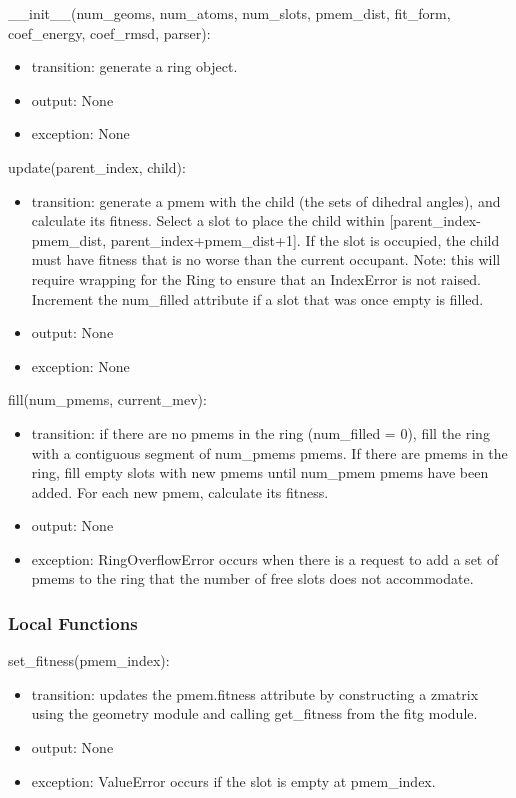\documentclass[12pt, titlepage]{article}
\begin{document}
\noindent \_\_init\_\_(num\_geoms, num\_atoms, num\_slots, pmem\_dist, 
fit\_form, coef\_energy, coef\_rmsd, parser):
\begin{itemize}
	\item transition: generate a ring object.
	\item output: None
	\item exception: None
\end{itemize}

\noindent update(parent\_index, child):
\begin{itemize}
	\item transition: generate a pmem with the child (the sets of dihedral 
	angles), and calculate its fitness. Select a slot to place the child within 
	[parent\_index-pmem\_dist, parent\_index+pmem\_dist+1]. If the slot is 
	occupied, the child must have fitness that is no worse than the current 
	occupant. Note: this will require wrapping for the Ring to ensure that an 
	IndexError is not raised. Increment the num\_filled attribute if a slot 
	that was once empty is filled.
	\item output: None
	\item exception: None
\end{itemize}

\noindent fill(num\_pmems, current\_mev):
\begin{itemize}
	\item transition: if there are no pmems in the ring (num\_filled = 0), fill 
	the ring with a contiguous segment of num\_pmems pmems. If there are pmems 
	in the ring, fill empty slots with new pmems until num\_pmem pmems have 
	been added. For each new pmem, calculate its fitness.
	\item output: None
	\item exception: RingOverflowError occurs when there is a request to add a 
	set of pmems to the ring that the number of free slots does not accommodate.
\end{itemize}

\subsubsection{Local Functions}

\noindent set\_fitness(pmem\_index):
\begin{itemize}
	\item transition: updates the pmem.fitness attribute by constructing a 
	zmatrix using the geometry module and calling get\_fitness from the fitg 
	module.
	\item output: None
	\item exception: ValueError occurs if the slot is empty at pmem\_index.
\end{itemize}
\end{document}

